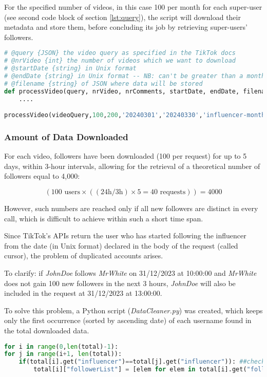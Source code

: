 For the specified number of videos, in this case 100 per month for each super-user (see second code block of section \ref{lst:query}), the script will download their metadata and store them, before concluding its job by retrieving super-users' followers.

\begin{lstlisting}[language=Python]
# @query {JSON} the video query as specified in the TikTok docs
# @nrVideo {int} the number of videos which we want to download
# @startDate {string} in Unix format
# @endDate {string} in Unix format -- NB: can't be greater than a month
# @filename {string} of JSON where data will be stored
def processVideo(query, nrVideo, nrComments, startDate, endDate, filename):
    ....

processVideo(videoQuery,100,200,'20240301','20240330','influencer-month')
\end{lstlisting}

\subsubsection*{Amount of Data Downloaded}

For each video, followers have been downloaded (100 per request) for up to 5 days, within 3-hour intervals, allowing for the retrieval of a theoretical number of followers equal to 4,000:

\[ (100 \text{ users} \times ((24 \text{h}/3 \text{h}) \times 5 = 40 \text{ requests})) = 4000 \]

However, such numbers are reached only if all new followers are distinct in every call, which is difficult to achieve within such a short time span.

Since TikTok's APIs return the user who has started following the influencer from the date (in Unix format) declared in the body of the request (called cursor), the problem of duplicated accounts arises.

To clarify: if \textit{JohnDoe} follows \textit{MrWhite} on 31/12/2023 at 10:00:00 and \textit{MrWhite} does not gain 100 new followers in the next 3 hours, \textit{JohnDoe} will also be included in the request at 31/12/2023 at 13:00:00.

To solve this problem, a Python script (\textit{DataCleaner.py}) was created, which keeps only the first occurrence (sorted by ascending date) of each username found in the total downloaded data.

\begin{lstlisting}[language=Python]
for i in range(0,len(total)-1):
for j in range(i+1, len(total)):
    if(total[i].get("influencer")==total[j].get("influencer")): ##check if the same influencer (we don't want to remove common followers)
        total[i]["followerList"] = [elem for elem in total[i].get("followerList") if elem not in total[j].get("followerList")]
\end{lstlisting}


